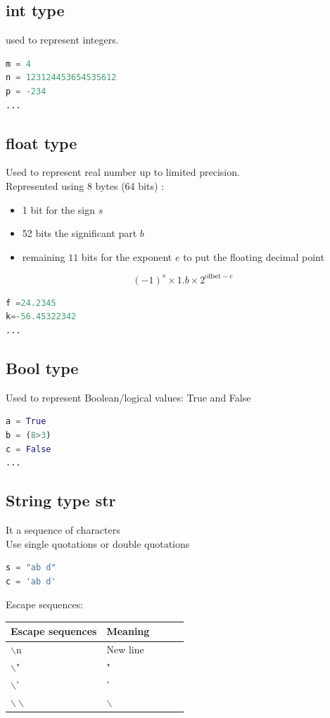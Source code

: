 \documentclass[12pt,oneside]{book}
\begin{document}
\subsection{int type}
used to represent integers.
\begin{lstlisting}[language=python]
m = 4 
n = 123124453654535612
p = -234
...
\end{lstlisting}
\subsection{float type}
Used to represent real number up to limited precision.\\
Represented using 8 bytes (64 bits) :
\begin{itemize}
	\item 1 bit for the sign $s$
	\item 52 bits the significant part $b$
	\item remaining $11$ bits for the exponent $e$ to put the floating decimal point
\end{itemize}
\[ (-1)^s \times 1.b\times 2^{\text{offset} - e} \]
\begin{lstlisting}[language=python]
f =24.2345
k=-56.45322342
...
\end{lstlisting}
\subsection{Bool type}
Used to represent Boolean/logical values: True and False
\begin{lstlisting}[language=python]
a = True
b = (8>3)
c = False 
...
\end{lstlisting}
\subsection{String type str}
It a sequence of characters\\
Use single quotations or double quotations
\begin{lstlisting}[language=python]
s = "ab d"
c = 'ab d'
\end{lstlisting}
Escape sequences:\\
\begin{tabular}{|l|l|l|l|l|}
	\hline
	Escape sequences       & Meaning      \\ \hline
	$\backslash$n          & New line     \\ \hline
	$\backslash$"          & "            \\ \hline
	$\backslash$'          & '            \\ \hline
	$\backslash\backslash$ & $\backslash$ \\ \hline
\end{tabular}
\end{document}
